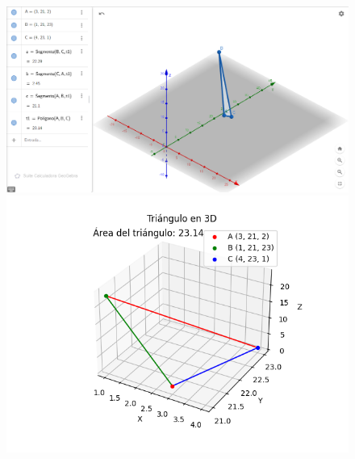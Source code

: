 \documentclass{article}
\begin{document}
\begin{figure}[h!]
    \begin{minipage}{0.45\textwidth}
        \centering
        \includegraphics[width=\textwidth]{imgs/triangulo_A_Geogebra.png}
    \end{minipage}
    \hfill
    \begin{minipage}{0.45\textwidth}
        \centering
        \includegraphics[width=\textwidth]{imgs/triangulo_A_python.png}
    \end{minipage}
    
    \vspace{0.5cm}
    

\end{figure}
\end{document}
